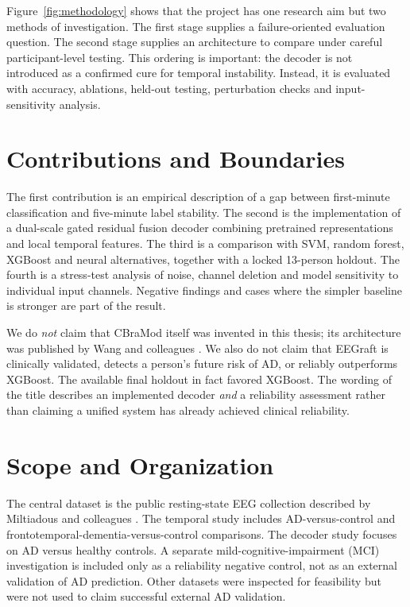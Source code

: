 
Figure~\ref{fig:methodology} shows that the project has one research aim but two methods of investigation. The first stage supplies a failure-oriented evaluation question. The second stage supplies an architecture to compare under careful participant-level testing. This ordering is important: the decoder is not introduced as a confirmed cure for temporal instability. Instead, it is evaluated with accuracy, ablations, held-out testing, perturbation checks and input-sensitivity analysis.

\section{Contributions and Boundaries}
The first contribution is an empirical description of a gap between first-minute classification and five-minute label stability. The second is the implementation of a dual-scale gated residual fusion decoder combining pretrained representations and local temporal features. The third is a comparison with SVM, random forest, XGBoost and neural alternatives, together with a locked 13-person holdout. The fourth is a stress-test analysis of noise, channel deletion and model sensitivity to individual input channels. Negative findings and cases where the simpler baseline is stronger are part of the result.

We do \emph{not} claim that CBraMod itself was invented in this thesis; its architecture was published by Wang and colleagues \cite{wang2025cbramod}. We also do not claim that EEGraft is clinically validated, detects a person's future risk of AD, or reliably outperforms XGBoost. The available final holdout in fact favored XGBoost. The wording of the title describes an implemented decoder \emph{and} a reliability assessment rather than claiming a unified system has already achieved clinical reliability.

\section{Scope and Organization}
The central dataset is the public resting-state EEG collection described by Miltiadous and colleagues \cite{miltiadous2023dataset,miltiadous2026dataset}. The temporal study includes AD-versus-control and frontotemporal-dementia-versus-control comparisons. The decoder study focuses on AD versus healthy controls. A separate mild-cognitive-impairment (MCI) investigation is included only as a reliability negative control, not as an external validation of AD prediction. Other datasets were inspected for feasibility but were not used to claim successful external AD validation.

